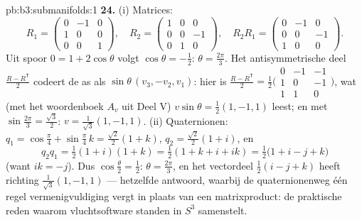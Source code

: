 \begin{solution}{pb:b3:submanifolds:1}
\textbf{24.} (i) Matrices:
\[
R_1 = \begin{pmatrix} 0 & -1 & 0\\ 1 & 0 & 0\\ 0 & 0 & 1
\end{pmatrix},
\quad
R_2 = \begin{pmatrix} 1 & 0 & 0\\ 0 & 0 & -1\\ 0 & 1 & 0
\end{pmatrix},
\quad
R_2R_1 = \begin{pmatrix} 0 & -1 & 0\\ 0 & 0 & -1\\ 1 & 0 &
0\end{pmatrix}.
\]
Uit spoor $0 = 1 + 2\cos\theta$ volgt $\cos\theta = -\frac12$:
$\theta = \frac{2\pi}3$. Het antisymmetrische deel $\frac{R -
R^{\mathsf T}}2$ codeert de as als $\sin\theta\,(v_3, -v_2,
v_1)$: hier is $\frac{R - R^{\mathsf T}}2 =
\frac12\bigl(\begin{smallmatrix}0 & -1 & -1\\ 1 & 0 & -1\\ 1
& 1 & 0\end{smallmatrix}\bigr)$, wat (met het woordenboek $A_v$
uit Deel V) $v\sin\theta = \frac12(1, -1, 1)$ leest; en met
$\sin\frac{2\pi}3 = \frac{\sqrt3}2$: $v = \frac1{\sqrt3}(1, -1,
1)$.
(ii) Quaternionen: $q_1 = \cos\frac\pi4 + \sin\frac\pi4\,k =
\frac{\sqrt2}2(1 + k)$, $q_2 = \frac{\sqrt2}2(1 + i)$, en
\[
q_2q_1 = \tfrac12(1 + i)(1 + k) = \tfrac12(1 + k + i + ik)
= \tfrac12\bigl(1 + i - j + k\bigr)
\]
(want $ik = -j$). Dus $\cos\frac\theta2 = \frac12$: $\theta =
\frac{2\pi}3$, en het vectordeel $\frac12(i - j + k)$ heeft
richting $\frac1{\sqrt3}(1, -1, 1)$ --- hetzelfde antwoord,
waarbij de quaternionenweg één regel vermenigvuldiging vergt in
plaats van een matrixproduct: de praktische reden waarom
vluchtsoftware standen in $S^3$ samenstelt.


\end{solution}
